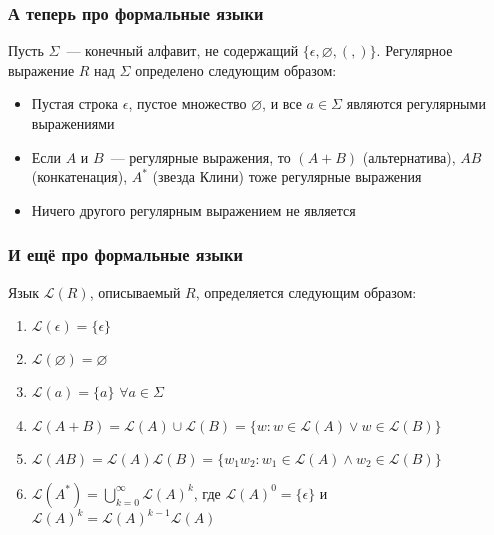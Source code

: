\documentclass[
    aspectratio=169,
]{beamer}
\begin{document}
\begin{frame}
    \frametitle{А теперь про формальные языки}

    \begin{definition} %
        Пусть $\Sigma$~--- конечный алфавит, не содержащий $\{\epsilon, \varnothing, (, )\}$.
        Регулярное выражение $R$ над $\Sigma$ определено следующим образом:
        \begin{itemize}
            \item Пустая строка $\epsilon$, пустое множество $\varnothing$, и все $a \in \Sigma$ являются регулярными выражениями
            \item Если $A$ и $B$~--- регулярные выражения, то $(A + B)$ (альтернатива), $AB$ (конкатенация), $A^*$ (звезда Клини) тоже регулярные выражения
            \item Ничего другого регулярным выражением не является
        \end{itemize}
    \end{definition}

\end{frame}

\begin{frame}
    \frametitle{И ещё про формальные языки}

    \begin{definition}
        Язык $\mathcal{L}(R)$, описываемый $R$, определяется следующим образом:
        \begin{enumerate}
            \item $\mathcal{L}(\epsilon) = \{\epsilon\}$
            \item $\mathcal{L}(\varnothing) = \varnothing$
            \item $\mathcal{L}(a) = \{a\}$ $\forall a \in \Sigma$
            \item $\mathcal{L}(A + B) = \mathcal{L}(A) \cup \mathcal{L}(B) = \{ w : w \in \mathcal{L}(A) \lor w \in \mathcal{L}(B)\}$
            \item $\mathcal{L}(AB) = \mathcal{L}(A) \mathcal{L}(B) = \{ w_1 w_2 : w_1 \in \mathcal{L}(A) \land w_2 \in \mathcal{L}(B)\}$
            \item $\mathcal{L}(A^*) = \bigcup_{k=0}^\infty \mathcal{L}(A)^k$, где $\mathcal{L}(A)^0 = \{\epsilon\}$ и $\mathcal{L}(A)^k = \mathcal{L}(A)^{k-1} \mathcal{L}(A)$
        \end{enumerate}
    \end{definition}

\end{frame}
\end{document}
